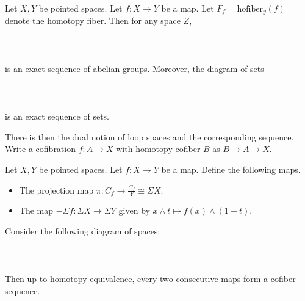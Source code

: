 \documentclass[a4paper]{article}
\begin{document}
\begin{thm}{}{} Let $X,Y$ be pointed spaces. Let $f:X\to Y$ be a map. Let $F_f=\text{hofiber}_y(f)$ denote the homotopy fiber. Then for any space $Z$, \\~\\
\\~\\
is an exact sequence of abelian groups. Moreover, the diagram of sets \\~\\
\\~\\
is an exact sequence of sets. 
\end{thm}

There is then the dual notion of loop spaces and the corresponding sequence. Write a cofibration $f:A\to X$ with homotopy cofiber $B$ as $B\to A\to X$. 

\begin{thm}{}{} Let $X,Y$ be pointed spaces. Let $f:X\to Y$ be a map. Define the following maps. 
\begin{itemize}
\item The projection map $\pi:C_f\to\frac{C_f}{Y}\cong\Sigma X$. 
\item The map $-\Sigma f:\Sigma X\to\Sigma Y$ given by $x\wedge t\mapsto f(x)\wedge(1-t)$. 
\end{itemize}
Consider the following diagram of spaces: \\~\\
\\~\\
Then up to homotopy equivalence, every two consecutive maps form a cofiber sequence. 
\end{thm}
\end{document}
